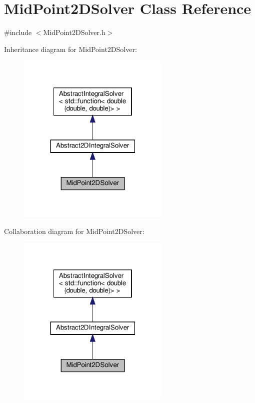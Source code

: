 \hypertarget{class_mid_point2_d_solver}{}\section{Mid\+Point2\+D\+Solver Class Reference}
\label{class_mid_point2_d_solver}


{\ttfamily \#include $<$Mid\+Point2\+D\+Solver.\+h$>$}



Inheritance diagram for Mid\+Point2\+D\+Solver\+:
\nopagebreak
\begin{figure}[H]
\begin{center}
\leavevmode
\includegraphics[width=206pt]{class_mid_point2_d_solver__inherit__graph}
\end{center}
\end{figure}


Collaboration diagram for Mid\+Point2\+D\+Solver\+:
\nopagebreak
\begin{figure}[H]
\begin{center}
\leavevmode
\includegraphics[width=206pt]{class_mid_point2_d_solver__coll__graph}
\end{center}
\end{figure}
